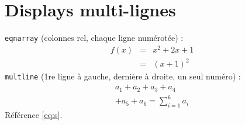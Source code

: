 \documentclass{article}
\begin{document}
\hsize=380pt
\section{Displays multi-lignes}
\texttt{eqnarray} (colonnes rcl, chaque ligne num\'erot\'ee) :
\begin{eqnarray}
f(x) &=& x^2 + 2x + 1 \\
     &=& (x+1)^2
\end{eqnarray}
\texttt{multline} (1re ligne \`a gauche, derni\`ere \`a droite, un seul num\'ero) :
\begin{multline}
a_1 + a_2 + a_3 + a_4 \\
+ a_5 + a_6 = \sum_{i=1}^{6} a_i \label{eq:s}
\end{multline}
R\'ef\'erence \eqref{eq:s}.
\end{document}
